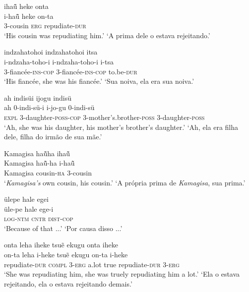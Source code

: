 \documentclass[output=paper,
modfonts,nonflat
]{langsci/langscibook}
\begin{document}
\ea  ihaü̃ heke onta\\[.3em]
\gll i-haü̃ heke on-ta\\
     3-cousin \textsc{erg} repudiate-\textsc{dur}\\
\glt ‘His cousin was repudiating him.’
\glt ‘A prima dele o estava rejeitando.’
\z 

\ea  indzahatohoi indzahatohoi itsa\\[.3em]
\gll i-ndzaha-toho-i i-ndzaha-toho-i i-tsa\\
     3-fiancée-\textsc{ins}-\textsc{cop} 3-fiancée-\textsc{ins}-\textsc{cop} to.be-\textsc{dur}\\
\glt ‘His fiancée, she was his fiancée.’
\glt ‘Sua noiva, ela era sua noiva.’
\z 

\ea  ah indisüi ijogu indisü\\[.3em]
\gll ah 0-indi-sü-i i-jo-gu 0-indi-sü\\
     \textsc{expl} 3-daughter-\textsc{poss}-\textsc{cop} 3-mother's.brother-\textsc{poss} 3-daughter-\textsc{poss}\\
\glt ‘Ah, she was his daughter, his mother's brother's daughter.’
\glt ‘Ah, ela era filha dele, filha do irmão de sua mãe.’
\z 

\ea  Kamagisa haü̃ha ihaü̃\\[.3em]
\gll Kamagisa haü̃-ha i-haü̃\\
     Kamagisa cousin-\textsc{ha}{\footnotemark} 3-cousin\\
\glt ‘\textit{Kamagisa's} own cousin, his cousin.’
\glt ‘A própria prima de \textit{Kamagisa}, sua prima.’
\z 
{}

\ea  ülepe hale egei\\[.3em]
\gll üle-pe hale ege-i\\
     \textsc{log}-\textsc{ntm} \textsc{cntr} \textsc{dist}-\textsc{cop}\\
\glt ‘Because of that ...’
\glt ‘Por causa disso ...’
\z 

\ea  onta leha iheke tsuẽ ekugu onta iheke\\[.3em]
\gll on-ta leha i-heke tsuẽ ekugu on-ta i-heke\\
     repudiate-\textsc{dur} \textsc{compl} 3-\textsc{erg} a.lot true repudiate-\textsc{dur} 3-\textsc{erg}\\
\glt ‘She was repudiating him, she was truely repudiating him a lot.’
\glt ‘Ela o estava rejeitando, ela o estava rejeitando demais.’
\z 
\end{document}
